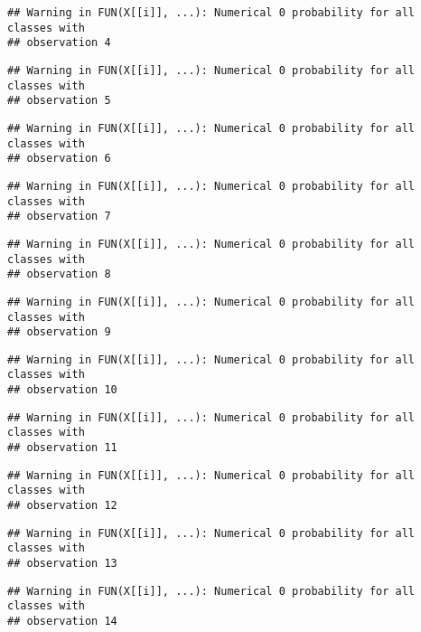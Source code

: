 \documentclass[
]{article}
\begin{document}
\begin{verbatim}
## Warning in FUN(X[[i]], ...): Numerical 0 probability for all classes with
## observation 4
\end{verbatim}

\begin{verbatim}
## Warning in FUN(X[[i]], ...): Numerical 0 probability for all classes with
## observation 5
\end{verbatim}

\begin{verbatim}
## Warning in FUN(X[[i]], ...): Numerical 0 probability for all classes with
## observation 6
\end{verbatim}

\begin{verbatim}
## Warning in FUN(X[[i]], ...): Numerical 0 probability for all classes with
## observation 7
\end{verbatim}

\begin{verbatim}
## Warning in FUN(X[[i]], ...): Numerical 0 probability for all classes with
## observation 8
\end{verbatim}

\begin{verbatim}
## Warning in FUN(X[[i]], ...): Numerical 0 probability for all classes with
## observation 9
\end{verbatim}

\begin{verbatim}
## Warning in FUN(X[[i]], ...): Numerical 0 probability for all classes with
## observation 10
\end{verbatim}

\begin{verbatim}
## Warning in FUN(X[[i]], ...): Numerical 0 probability for all classes with
## observation 11
\end{verbatim}

\begin{verbatim}
## Warning in FUN(X[[i]], ...): Numerical 0 probability for all classes with
## observation 12
\end{verbatim}

\begin{verbatim}
## Warning in FUN(X[[i]], ...): Numerical 0 probability for all classes with
## observation 13
\end{verbatim}

\begin{verbatim}
## Warning in FUN(X[[i]], ...): Numerical 0 probability for all classes with
## observation 14
\end{verbatim}
\end{document}
